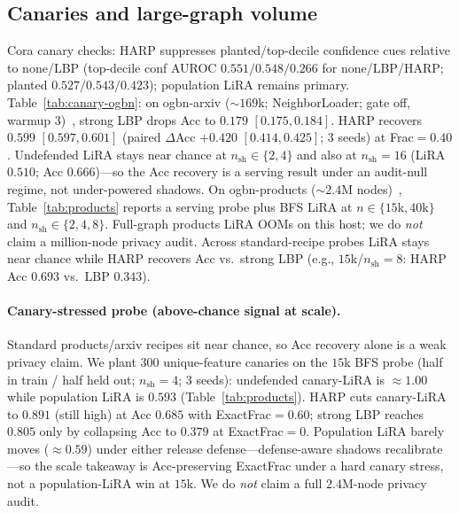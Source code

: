\documentclass[conference]{IEEEtran}
\begin{document}
\subsection{Canaries and large-graph volume}
Cora canary checks: HARP suppresses planted/top-decile confidence cues relative to none/LBP (top-decile conf AUROC $0.551/0.548/0.266$ for none/LBP/HARP; planted $0.527/0.543/0.423$); population LiRA remains primary.
Table~\ref{tab:canary-ogbn}: on ogbn-arxiv (${\sim}169$k; NeighborLoader; gate off, warmup $3$)~\cite{hu2020ogb}, strong LBP drops Acc to $0.179$ $[0.175,0.184]$.
HARP recovers $0.599$ $[0.597,0.601]$ (paired $\Delta$Acc $+0.420$ $[0.414,0.425]$; 3 seeds) at Frac${=}0.40$.
Undefended LiRA stays near chance at $n_{\mathrm{sh}}{\in}\{2,4\}$ and also at $n_{\mathrm{sh}}{=}16$ (LiRA $0.510$; Acc $0.666$)---so the Acc recovery is a serving result under an audit-null regime, not under-powered shadows.
On ogbn-products (${\sim}2.4$M nodes)~\cite{hu2020ogb}, Table~\ref{tab:products} reports a serving probe plus BFS LiRA at $n{\in}\{15$k$,40$k$\}$ and $n_{\mathrm{sh}}{\in}\{2,4,8\}$.
Full-graph products LiRA OOMs on this host; we do \emph{not} claim a million-node privacy audit.
Across standard-recipe probes LiRA stays near chance while HARP recovers Acc vs.\ strong LBP (e.g., $15$k/$n_{\mathrm{sh}}{=}8$: HARP Acc $0.693$ vs.\ LBP $0.343$).

\paragraph{Canary-stressed probe (above-chance signal at scale).}
Standard products/arxiv recipes sit near chance, so Acc recovery alone is a weak privacy claim.
We plant $300$ unique-feature canaries on the $15$k BFS probe (half in train / half held out; $n_{\mathrm{sh}}{=}4$; 3 seeds): undefended canary-LiRA is ${\approx}1.00$ while population LiRA is $0.593$ (Table~\ref{tab:products}).
HARP cuts canary-LiRA to $0.891$ (still high) at Acc $0.685$ with ExactFrac${=}0.60$; strong LBP reaches $0.805$ only by collapsing Acc to $0.379$ at ExactFrac${=}0$.
Population LiRA barely moves (${\approx}0.59$) under either release defense---defense-aware shadows recalibrate---so the scale takeaway is Acc-preserving ExactFrac under a hard canary stress, not a population-LiRA win at $15$k.
We do \emph{not} claim a full $2.4$M-node privacy audit.
\end{document}
